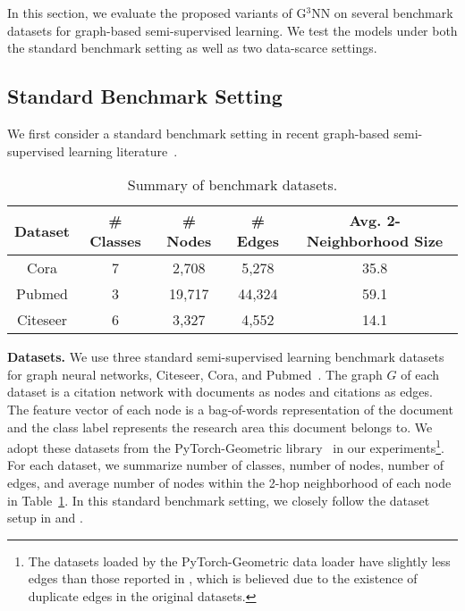 \documentclass{article}
\newcommand{\vpara}[1]{\vspace{0.05in}\noindent\textbf{#1 }}
\begin{document}
In this section, we evaluate the proposed variants of G$^3$NN on several benchmark datasets for graph-based semi-supervised learning. We test the models under both the standard benchmark setting \cite{yang2016revisiting} as well as two data-scarce settings.  

\subsection{Standard Benchmark Setting}

We first consider a standard benchmark setting in recent graph-based semi-supervised learning literature~\cite{yang2016revisiting,kipf2016semi,velivckovic2017graph}. 

\begin{table}[tb]
\centering
\caption{Summary of benchmark datasets.}
\label{tbl:dataset}
\begin{tabular}{ccccc}
\toprule
Dataset & \# Classes & \# Nodes & \# Edges & Avg. 2-Neighborhood Size\\
\midrule
Cora & 7& 2,708& 5,278& 35.8\\
Pubmed & 3& 19,717& 44,324& 59.1\\
Citeseer & 6& 3,327& 4,552& 14.1\\
\bottomrule
\end{tabular}

\end{table}

\vpara{Datasets.}
We use three standard semi-supervised learning benchmark datasets for graph neural networks, Citeseer, Cora, and Pubmed~\cite{sen2008collective,yang2016revisiting}. The graph $G$ of each dataset is a citation network with documents as nodes and citations as edges. The feature vector of each node is a bag-of-words representation of the document and the class label represents the research area this document belongs to. We adopt these datasets from the PyTorch-Geometric library~\cite{fey2019fast} in our experiments\footnote{The datasets loaded by the PyTorch-Geometric data loader have slightly less edges than those reported in \citet{yang2016revisiting}, which is believed due to the existence of duplicate edges in the original datasets.}. For each dataset, we summarize number of classes, number of nodes, number of edges, and average number of nodes within the 2-hop neighborhood of each node in Table~\ref{tbl:dataset}. In this standard benchmark setting, we closely follow the dataset setup in \citet{yang2016revisiting} and \citet{kipf2016semi}. 
\end{document}

